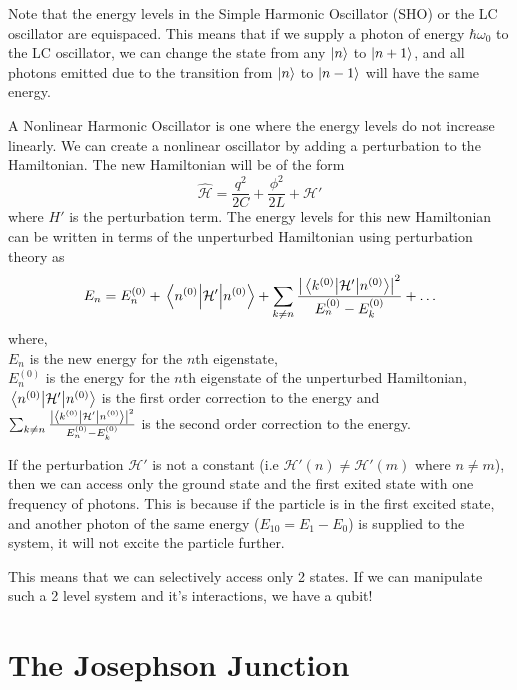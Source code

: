 Note that the energy levels in the Simple Harmonic Oscillator (SHO) or the LC oscillator are equispaced. This means that if we supply a photon of energy $\hbar\omega_0$ to the LC oscillator, we can change the state from any $\ket{n}$ to $\ket{n+1}$, and all photons emitted due to the transition from $\ket{n}$ to $\ket{n-1}$ will have the same energy.

A Nonlinear Harmonic Oscillator is one where the energy levels do not increase linearly. We can create a nonlinear oscillator by adding a perturbation to the Hamiltonian. The new Hamiltonian will be of the form
\begin{equation}
\hat{\mathcal{H}}=\frac{q^2}{2C}+\frac{\phi^2}{2L} +\mathcal{H}'
\end{equation}
where $H'$ is the perturbation term.
The energy levels for this new Hamiltonian can be written in terms of the unperturbed Hamiltonian using perturbation theory as
\begin{equation}
E_n=E_n^{(0)}+\expval{\mathcal{H}'}{n^{(0)}}+\sum_{k\neq n}\frac{\left|\mel{k^{(0)}}{\mathcal{H}'}{n^{(0)}}\right|^2}{E_n^{(0)}-E_k^{(0)}}+\ldots
\end{equation}
where,\\
$E_n$ is the new energy for the $n$th eigenstate,\\
$E_n^{(0)}$ is the energy for the $n$th eigenstate of the unperturbed Hamiltonian,\\
$\expval{\mathcal{H}'}{n^{(0)}}$ is the first order correction to the energy and\\
$\sum_{k\neq n}\frac{\left|\mel{k^{(0)}}{\mathcal{H}'}{n^{(0)}}\right|^2}{E_n^{(0)}-E_k^{(0)}}$ is the second order correction to the energy.

If the perturbation $\mathcal{H}'$ is not a constant (i.e $\mathcal{H}'(n)\neq \mathcal{H}'(m)$ where $n\neq m$), then we can access only the ground state and the first exited state with one frequency of photons. This is because if the particle is in the first excited state, and another photon of the same energy ($E_{10}=E_1-E_0$) is supplied to the system, it will not excite the particle further.

This means that we can selectively access only 2 states. If we can manipulate such a 2 level system and it's interactions, we have a qubit!

\section{The Josephson Junction}

